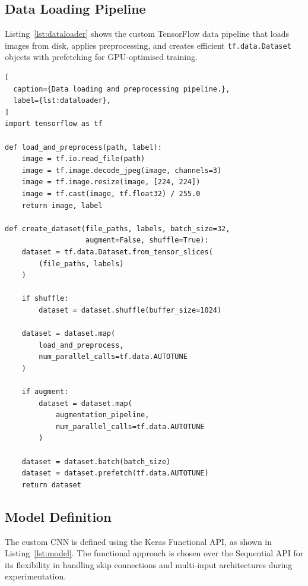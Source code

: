 \documentclass[11pt,a4paper]{article}
\begin{document}
\subsection{Data Loading Pipeline}

Listing~\ref{lst:dataloader} shows the custom TensorFlow data pipeline that
loads images from disk, applies preprocessing, and creates efficient
\texttt{tf.data.Dataset} objects with prefetching for GPU-optimised training.

\begin{lstlisting}[
  caption={Data loading and preprocessing pipeline.},
  label={lst:dataloader},
]
import tensorflow as tf

def load_and_preprocess(path, label):
    image = tf.io.read_file(path)
    image = tf.image.decode_jpeg(image, channels=3)
    image = tf.image.resize(image, [224, 224])
    image = tf.cast(image, tf.float32) / 255.0
    return image, label

def create_dataset(file_paths, labels, batch_size=32,
                   augment=False, shuffle=True):
    dataset = tf.data.Dataset.from_tensor_slices(
        (file_paths, labels)
    )

    if shuffle:
        dataset = dataset.shuffle(buffer_size=1024)

    dataset = dataset.map(
        load_and_preprocess,
        num_parallel_calls=tf.data.AUTOTUNE
    )

    if augment:
        dataset = dataset.map(
            augmentation_pipeline,
            num_parallel_calls=tf.data.AUTOTUNE
        )

    dataset = dataset.batch(batch_size)
    dataset = dataset.prefetch(tf.data.AUTOTUNE)
    return dataset
\end{lstlisting}

\subsection{Model Definition}

The custom CNN is defined using the Keras Functional API, as shown in
Listing~\ref{lst:model}. The functional approach is chosen over the
Sequential API for its flexibility in handling skip connections and
multi-input architectures during experimentation.
\end{document}
